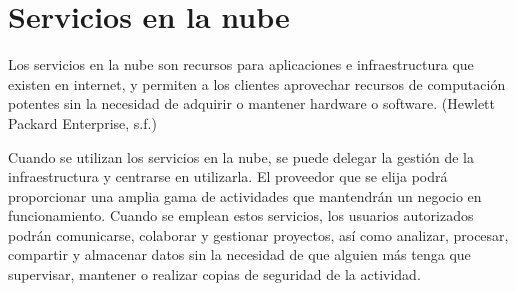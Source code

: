 \section{Servicios en la nube}
Los servicios en la nube son recursos para aplicaciones e infraestructura que existen en internet, y permiten a los clientes aprovechar recursos de computación potentes sin la necesidad de adquirir o mantener hardware o software. (Hewlett Packard Enterprise, s.f.)

Cuando se utilizan los servicios en la nube, se puede delegar la gestión de la infraestructura y centrarse en utilizarla. El proveedor que se elija podrá proporcionar una amplia gama de actividades que mantendrán un negocio en funcionamiento. Cuando se emplean estos servicios, los usuarios autorizados podrán comunicarse, colaborar y gestionar proyectos, así como analizar, procesar, compartir y almacenar datos sin la necesidad de que alguien más tenga que supervisar, mantener o realizar copias de seguridad de la actividad.
    
    
    